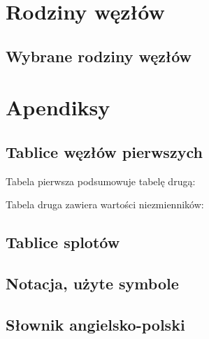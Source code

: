 \documentclass{LegrandOrangeBook}
\begin{document}
\part{Rodziny węzłów}
\chapter{Wybrane rodziny węzłów}










\part{Apendiksy}
\chapterspaceabove{5.75cm} %
\chapterspacebelow{7.25cm} %

\begin{appendices}
    \renewcommand{\chaptername}{Appendix} %
    \chapter{Tablice węzłów pierwszych}
    
    Tabela pierwsza podsumowuje tabelę drugą:
    
    \newpage
    Tabela druga zawiera wartości niezmienników:
    
    

    \chapter{Tablice splotów}
    

    \chapter{Notacja, użyte symbole}
    

    \chapter{Słownik angielsko-polski}
    \begin{compactitem}
    
    \end{compactitem}
\end{appendices}


\end{document}
